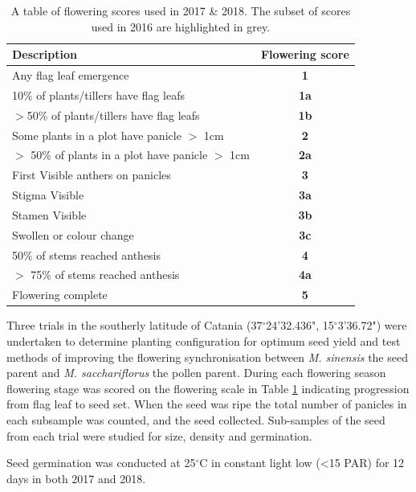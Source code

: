 \documentclass[fleqn, 15pt, lineno]{olplainarticle}
\begin{document}
\begin{table}[ht]\tiny
\renewcommand{\arraystretch}{1.3}
\caption{A table of flowering scores used in 2017 \& 2018.
The subset of scores used in 2016 are highlighted in grey.}
\centering
\begin{tabular}{l  c}
\toprule
\textbf{Description} & \textbf{Flowering score}\\
\midrule
					Any flag leaf emergence 							&\textbf{1}\\
\rowcolor[gray]{.9} 10\% of plants/tillers have flag leafs 				&\textbf{1a}\\	
					$>$50\% of plants/tillers have flag leafs 			&\textbf{1b}\\	
\rowcolor[gray]{.9} Some plants in a plot have panicle $>$ 1cm			&\textbf{2}\\
					$>$ 50\% of plants in a plot have panicle $>$ 1cm	&\textbf{2a}\\
\rowcolor[gray]{.9} First Visible anthers on panicles					&\textbf{3}\\
					Stigma Visible										&\textbf{3a}\\
					Stamen Visible										&\textbf{3b}\\
					Swollen or colour change							&\textbf{3c}\\
					50\% of stems reached anthesis						&\textbf{4}\\
					$>$ 75\% of stems reached anthesis					&\textbf{4a}\\
					Flowering complete									&\textbf{5}\\
\toprule
\end{tabular}
\label{tab:FS}
\end{table}


Three trials in the southerly latitude of Catania (37$^{\circ}$24'32.436", 15$^{\circ}$3'36.72") were undertaken to determine planting configuration for optimum seed yield and test methods of improving the flowering synchronisation between \textit{M. sinensis} the seed parent and \textit{M. sacchariflorus} the pollen parent.
During each flowering season flowering stage was scored on the flowering scale in Table \ref{tab:FS} indicating progression from flag leaf to seed set.
When the seed was ripe the total number of panicles in each subsample was counted, and the seed collected.
Sub-samples of the seed from each trial were studied for size, density and germination.

Seed germination was conducted at 25$^{\circ}$C in constant light low (<15 PAR) for 12 days in both 2017 and 2018. 
\end{document}
